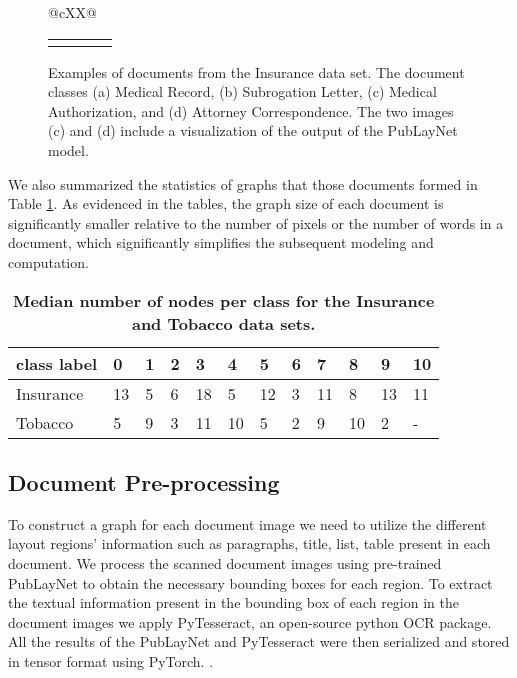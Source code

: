 \documentclass[letterpaper]{article}
\begin{document}
\begin{figure*}[t]
\begin{center}
\def\tabularxcolumn#1{m{#1}}
\begin{tabularx}{\linewidth}{@{}cXX@{}}
\begin{tabular}{cccc}
\subfloat[Medical Record]{\texttt{[image: main/Images/gnn\_paper\_medical\_record.png]}} 
   & \subfloat[Subrogation Letter]{\texttt{[image: main/Images/gnn\_paper\_subro\_letter.png]}}
   & \subfloat[Medical Authorization]{\texttt{[image: main/Images/gnn\_paper\_medical\_authorization.png]}}
   & \subfloat[Attorney Correspondence]{\texttt{[image: main/Images/gnn\_paper\_attorney\_correspondence.png]}} \\
\end{tabular}
\end{tabularx}
\end{center}
\caption{Examples of documents from the Insurance data set. The document classes (a) Medical Record, (b) Subrogation Letter, (c) Medical Authorization, and (d) Attorney Correspondence. The two images (c) and (d) include a visualization of the output of the PubLayNet model.}
\label{fig:insurance_imgs}
\end{figure*}

We also summarized the statistics of graphs that those documents formed in Table \ref{Table1:DatasetState}. As evidenced in the tables, the graph size of each document is significantly smaller relative to the number of pixels or the number of words in a document, which significantly simplifies the subsequent modeling and computation. 
\begin{table}
\begin{tabular}{p{1.1cm}p{0.15cm}p{0.15cm}p{0.15cm}p{0.15cm}p{0.15cm}p{0.15cm}p{0.15cm}p{0.15cm}p{0.15cm}p{0.15cm}p{0.15cm}}
\toprule
 class label & 0  &  1  &  2  &  3  &  4  &  5  &  6  &  7  &  8  &  9  &  10 \\
\midrule
  Insurance & 13 &   5 &   6 &  18 &   5 &  12 &   3 &  11 &  8 &  13 &  11 \\
\midrule
 Tobacco & 5 &  9 &  3 &  11 &  10 &  5 &  2 &  9 &  10 &  2 & - \\
\bottomrule
\end{tabular}
\caption{\textbf{Median number of nodes per class for the Insurance and Tobacco data sets.}}
\label{Table1:DatasetState}
\end{table}


\subsection{Document Pre-processing}
To construct a graph for each document image we need to utilize the different layout regions' information such as paragraphs, title, list, table present in each document. We process the scanned document images using pre-trained PubLayNet to obtain the necessary bounding boxes for each region. To extract the textual information present in the bounding box of each region in the document images we apply PyTesseract, an open-source python OCR package. All the results of the PubLayNet and PyTesseract were then serialized and stored in tensor format using PyTorch. \cite{Pytorch}. 
\end{document}
